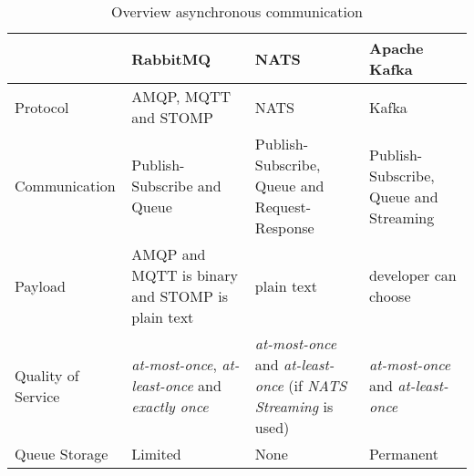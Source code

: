 \begin{table}[h!]
	\begin{tabularx}{\linewidth}{ |l| X | X | X | }
		\hline                                                                                            &   
		RabbitMQ                                                                                          &   
		NATS                                                                                              &   
		Apache Kafka                                                                                        \\
																
		\hline
		Protocol                                                                                          &   
		\ac{AMQP}, \ac{MQTT} and \ac{STOMP}                                                               &   
		NATS                                                                                              &   
		Kafka                                                                                               \\
																
		Communication                                                                                     &   
		Publish-Subscribe and Queue                                                                       &   
		Publish-Subscribe, Queue and Request-Response                                                     &   
		Publish-Subscribe, Queue and Streaming                                                              \\
																
		Payload                                                                                           &   
		\ac{AMQP} and \ac{MQTT} is binary and \ac{STOMP} is plain text                                    &   
		plain text                                                                                        &   
		developer can choose \cite{RobinMoffatt.2018}                                                          \\
																
		Quality of Service                                                                                &   
		\textit{at-most-once}, \textit{at-least-once} and \textit{exactly once} \cite{PaoloPatierno.2018} &   
		\textit{at-most-once} and \textit{at-least-once} (if \textit{NATS Streaming} is used)             &   
		\textit{at-most-once} and \textit{at-least-once} \cite{AjmalKaruthakantakath.2016}                  \\
		Queue Storage                                                                                     &   
		Limited                                                                                           &   
		None                                                                                              &   
		Permanent                                                                                           \\
		\hline
	\end{tabularx}
	\caption{Overview asynchronous communication}
	\label{tab:overviewAsynchronousCommunication}
\end{table}

